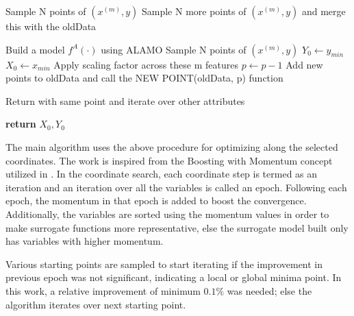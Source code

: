 \begin{algorithm}

\begin{algorithmic}[1]
\State {}

    \State Sample N points of $(x^{(m)}, y)$
\Else       
    \State Sample N more points of $(x^{(m)}, y)$ and merge this with the oldData
\EndIf

\State Build a model $f^{A}(\cdot)$ using ALAMO 
\State {}
  
    \State Sample N points of $(x^{(m)}, y)$
      
        \State $Y_0 \gets y_{min}$
        \State $X_0 \gets x_{min}$  
        \State Apply scaling factor across these m features
    \Else
        \State $p \gets p-1$
        \State Add new points to oldData and call the NEW POINT(oldData, p) function
    \EndIf
    
\Else
    \State Return with same point and iterate over other attributes
\EndIf

\State \textbf{return} $X_0, Y_0$   
\EndProcedure
\end{algorithmic}
\end{algorithm}

\noindent
The main algorithm uses the above procedure for optimizing along the selected coordinates. The work is inspired from the Boosting with Momentum concept utilized in \cite{Mukherjee2013}. In the coordinate search, each coordinate step is termed as an iteration and an iteration over all the variables is called an epoch. Following each epoch, the momentum in that epoch is added to boost the convergence. Additionally, the variables are sorted using the momentum values in order to make surrogate functions more representative, else the surrogate model built only has variables with higher momentum.

\bigskip
\noindent
Various starting points are sampled to start iterating if the improvement in previous epoch was not significant, indicating a local or global minima point. In this work, a relative improvement of minimum $0.1\%$ was needed; else the algorithm iterates over next starting point.

